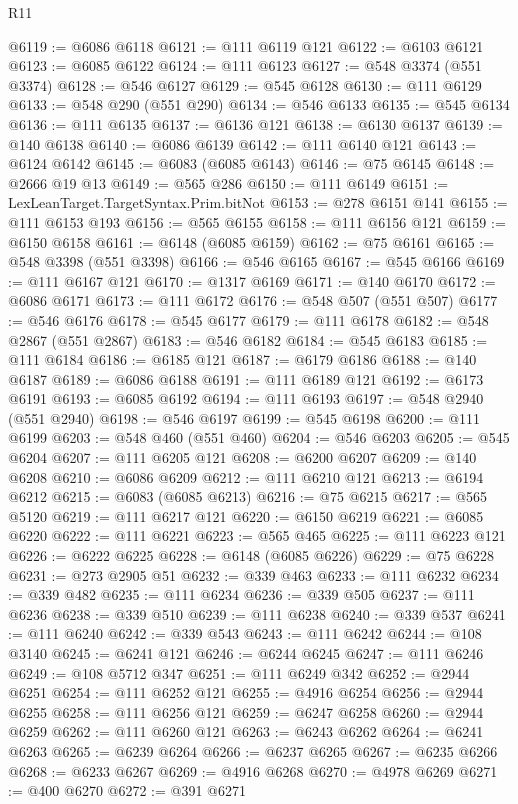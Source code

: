 \begin{lexlean}{R11}
\begin{coremodule}
@6119 := @6086 @6118
@6121 := @111 @6119 @121
@6122 := @6103 @6121
@6123 := @6085 @6122
@6124 := @111 @6123
@6127 := @548 @3374 (@551 @3374)
@6128 := @546 @6127
@6129 := @545 @6128
@6130 := @111 @6129
@6133 := @548 @290 (@551 @290)
@6134 := @546 @6133
@6135 := @545 @6134
@6136 := @111 @6135
@6137 := @6136 @121
@6138 := @6130 @6137
@6139 := @140 @6138
@6140 := @6086 @6139
@6142 := @111 @6140 @121
@6143 := @6124 @6142
@6145 := @6083 (@6085 @6143)
@6146 := @75 @6145
@6148 := @2666 @19 @13
@6149 := @565 @286
@6150 := @111 @6149
@6151 := LexLeanTarget.TargetSyntax.Prim.bitNot
@6153 := @278 @6151 @141
@6155 := @111 @6153 @193
@6156 := @565 @6155
@6158 := @111 @6156 @121
@6159 := @6150 @6158
@6161 := @6148 (@6085 @6159)
@6162 := @75 @6161
@6165 := @548 @3398 (@551 @3398)
@6166 := @546 @6165
@6167 := @545 @6166
@6169 := @111 @6167 @121
@6170 := @1317 @6169
@6171 := @140 @6170
@6172 := @6086 @6171
@6173 := @111 @6172
@6176 := @548 @507 (@551 @507)
@6177 := @546 @6176
@6178 := @545 @6177
@6179 := @111 @6178
@6182 := @548 @2867 (@551 @2867)
@6183 := @546 @6182
@6184 := @545 @6183
@6185 := @111 @6184
@6186 := @6185 @121
@6187 := @6179 @6186
@6188 := @140 @6187
@6189 := @6086 @6188
@6191 := @111 @6189 @121
@6192 := @6173 @6191
@6193 := @6085 @6192
@6194 := @111 @6193
@6197 := @548 @2940 (@551 @2940)
@6198 := @546 @6197
@6199 := @545 @6198
@6200 := @111 @6199
@6203 := @548 @460 (@551 @460)
@6204 := @546 @6203
@6205 := @545 @6204
@6207 := @111 @6205 @121
@6208 := @6200 @6207
@6209 := @140 @6208
@6210 := @6086 @6209
@6212 := @111 @6210 @121
@6213 := @6194 @6212
@6215 := @6083 (@6085 @6213)
@6216 := @75 @6215
@6217 := @565 @5120
@6219 := @111 @6217 @121
@6220 := @6150 @6219
@6221 := @6085 @6220
@6222 := @111 @6221
@6223 := @565 @465
@6225 := @111 @6223 @121
@6226 := @6222 @6225
@6228 := @6148 (@6085 @6226)
@6229 := @75 @6228
@6231 := @273 @2905 @51
@6232 := @339 @463
@6233 := @111 @6232
@6234 := @339 @482
@6235 := @111 @6234
@6236 := @339 @505
@6237 := @111 @6236
@6238 := @339 @510
@6239 := @111 @6238
@6240 := @339 @537
@6241 := @111 @6240
@6242 := @339 @543
@6243 := @111 @6242
@6244 := @108 @3140
@6245 := @6241 @121
@6246 := @6244 @6245
@6247 := @111 @6246
@6249 := @108 @5712 @347
@6251 := @111 @6249 @342
@6252 := @2944 @6251
@6254 := @111 @6252 @121
@6255 := @4916 @6254
@6256 := @2944 @6255
@6258 := @111 @6256 @121
@6259 := @6247 @6258
@6260 := @2944 @6259
@6262 := @111 @6260 @121
@6263 := @6243 @6262
@6264 := @6241 @6263
@6265 := @6239 @6264
@6266 := @6237 @6265
@6267 := @6235 @6266
@6268 := @6233 @6267
@6269 := @4916 @6268
@6270 := @4978 @6269
@6271 := @400 @6270
@6272 := @391 @6271

\end{coremodule}
\end{lexlean}
